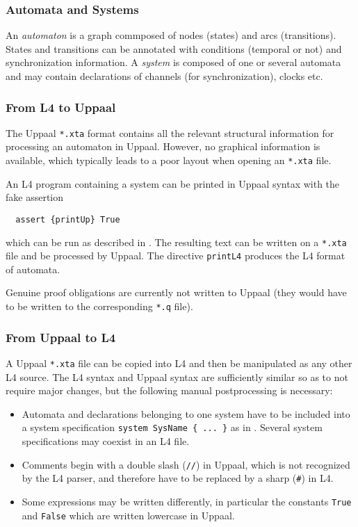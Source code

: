 \subsubsection{Automata and Systems}

An \emph{automaton} is a graph commposed of nodes (states) and arcs
(transitions). States and transitions can be annotated with conditions
(temporal or not) and synchronization information. A \emph{system} is composed
of one or several automata and may contain declarations of channels (for
synchronization), clocks etc.


\subsubsection{From L4 to Uppaal}

The Uppaal \texttt{*.xta} format contains all the relevant structural
information for processing an automaton in Uppaal. However, no graphical
information is available, which typically leads to a poor layout when opening
an \texttt{*.xta} file.

An L4 program containing a system can be printed in Uppaal syntax with the
fake assertion
\begin{lstlisting}
  assert {printUp} True
\end{lstlisting}
which can be run as described in . The resulting
text can be written on a \texttt{*.xta} file and be processed by Uppaal. The
directive \texttt{printL4} produces the L4 format of automata.

Genuine proof obligations are currently not written to Uppaal (they would have
to be written to the corresponding \texttt{*.q} file).

\subsubsection{From Uppaal to L4}

A Uppaal \texttt{*.xta} file can be copied into L4 and then be manipulated as
any other L4 source. The L4 syntax and Uppaal syntax are sufficiently similar
so as to not require major changes, but the following manual postprocessing is
necessary:
\begin{itemize}
\item Automata and declarations belonging to one system have to be included
  into a system specification \texttt{system SysName \{ ... \}} as in
  . Several system specifications may coexist in an L4
  file.
\item Comments begin with a double slash (\texttt{//}) in Uppaal, which is not
  recognized by the L4 parser, and therefore have to be replaced by a sharp
  (\texttt{\#}) in L4.
\item Some expressions may be written differently, in particular the constants
  \texttt{True} and \texttt{False} which are written lowercase in Uppaal.
\end{itemize}

